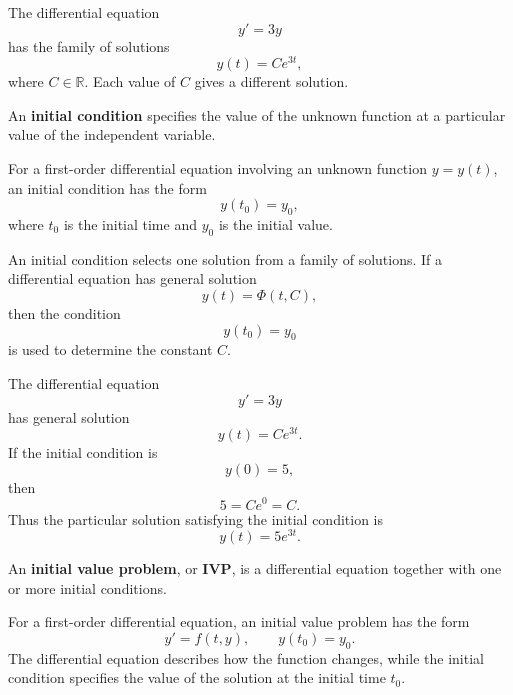 \begin{example}
The differential equation
\[
y'=3y
\]
has the family of solutions
\[
y(t)=Ce^{3t},
\]
where $C\in\mathbb{R}$. Each value of $C$ gives a different solution.
\end{example}



\begin{definition}
An \textbf{initial condition} specifies the value of the unknown function at a particular value of the independent variable.

For a first-order differential equation involving an unknown function $y=y(t)$, an initial condition has the form
\[
y(t_0)=y_0,
\]
where $t_0$ is the initial time and $y_0$ is the initial value.
\end{definition}

\begin{remark*}[Interpretation]
An initial condition selects one solution from a family of solutions. If a differential equation has general solution
\[
y(t)=\Phi(t,C),
\]
then the condition
\[
y(t_0)=y_0
\]
is used to determine the constant $C$.
\end{remark*}

\begin{example}
The differential equation
\[
y'=3y
\]
has general solution
\[
y(t)=Ce^{3t}.
\]
If the initial condition is
\[
y(0)=5,
\]
then
\[
5=Ce^{0}=C.
\]
Thus the particular solution satisfying the initial condition is
\[
y(t)=5e^{3t}.
\]
\end{example}



\begin{definition}
An \textbf{initial value problem}, or \textbf{IVP}, is a differential equation together with one or more initial conditions.

For a first-order differential equation, an initial value problem has the form
\[
y'=f(t,y),
\qquad
y(t_0)=y_0.
\]
The differential equation describes how the function changes, while the initial condition specifies the value of the solution at the initial time $t_0$.
\end{definition}

